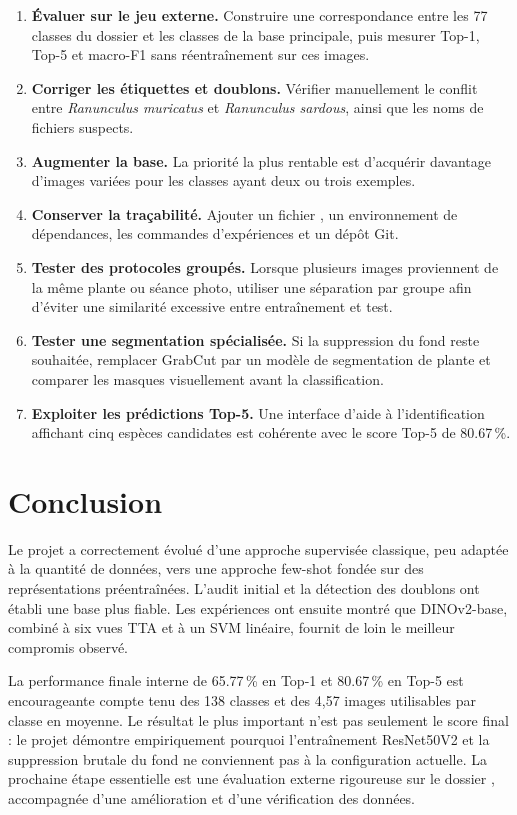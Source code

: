 \documentclass[12pt,a4paper]{report}
\newcommand{\fichier}[1]{\texttt{\detokenize{#1}}}
\newcommand{\pct}[1]{\num{#1}\,\%}
\begin{document}
\begin{enumerate}
  \item \textbf{Évaluer sur le jeu externe.} Construire une correspondance entre les 77 classes du dossier \fichier{test dataset} et les classes de la base principale, puis mesurer Top-1, Top-5 et macro-F1 sans réentraînement sur ces images.
  \item \textbf{Corriger les étiquettes et doublons.} Vérifier manuellement le conflit entre \emph{Ranunculus muricatus} et \emph{Ranunculus sardous}, ainsi que les noms de fichiers suspects.
  \item \textbf{Augmenter la base.} La priorité la plus rentable est d'acquérir davantage d'images variées pour les classes ayant deux ou trois exemples.
  \item \textbf{Conserver la traçabilité.} Ajouter un fichier \fichier{README.md}, un environnement de dépendances, les commandes d'expériences et un dépôt Git.
  \item \textbf{Tester des protocoles groupés.} Lorsque plusieurs images proviennent de la même plante ou séance photo, utiliser une séparation par groupe afin d'éviter une similarité excessive entre entraînement et test.
  \item \textbf{Tester une segmentation spécialisée.} Si la suppression du fond reste souhaitée, remplacer GrabCut par un modèle de segmentation de plante et comparer les masques visuellement avant la classification.
  \item \textbf{Exploiter les prédictions Top-5.} Une interface d'aide à l'identification affichant cinq espèces candidates est cohérente avec le score Top-5 de \pct{80,67}.
\end{enumerate}

\chapter*{Conclusion}

Le projet a correctement évolué d'une approche supervisée classique, peu adaptée à la quantité de données, vers une approche few-shot fondée sur des représentations préentraînées. L'audit initial et la détection des doublons ont établi une base plus fiable. Les expériences ont ensuite montré que DINOv2-base, combiné à six vues TTA et à un SVM linéaire, fournit de loin le meilleur compromis observé.

La performance finale interne de \pct{65,77} en Top-1 et \pct{80,67} en Top-5 est encourageante compte tenu des 138 classes et des 4,57 images utilisables par classe en moyenne. Le résultat le plus important n'est pas seulement le score final : le projet démontre empiriquement pourquoi l'entraînement ResNet50V2 et la suppression brutale du fond ne conviennent pas à la configuration actuelle. La prochaine étape essentielle est une évaluation externe rigoureuse sur le dossier \fichier{test dataset}, accompagnée d'une amélioration et d'une vérification des données.
\end{document}
